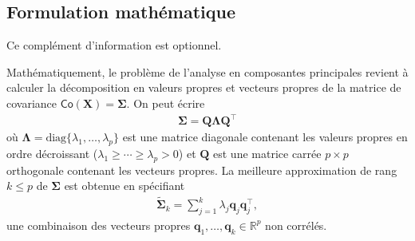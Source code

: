 \documentclass[
  11pt,
  letterpaper,
]{scrbook}
\theoremstyle{definition}
\theoremstyle{remark}
\begin{document}
\hypertarget{formulation-mathuxe9matique}{%
\subsection{Formulation
mathématique}\label{formulation-mathuxe9matique}}

Ce complément d'information est optionnel.

Mathématiquement, le problème de l'analyse en composantes principales
revient à calculer la décomposition en valeurs propres et vecteurs
propres de la matrice de covariance
\(\mathsf{Co}(\boldsymbol{X})=\boldsymbol{\Sigma}\). On peut écrire
\begin{align*}
\boldsymbol{\Sigma} = \boldsymbol{Q}\boldsymbol{\Lambda}\boldsymbol{Q}^\top
\end{align*} où
\(\boldsymbol{\Lambda} = \mathrm{diag}\{\lambda_1, \ldots, \lambda_p\}\)
est une matrice diagonale contenant les valeurs propres en ordre
décroissant (\(\lambda_1 \geq \cdots \geq \lambda_p > 0\)) et
\(\boldsymbol{Q}\) est une matrice carrée \(p \times p\) orthogonale
contenant les vecteurs propres. La meilleure approximation de rang
\(k \leq p\) de \(\boldsymbol{\Sigma}\) est obtenue en spécifiant
\begin{align*}
\widetilde{\boldsymbol{\Sigma}}_k = \sum_{j=1}^k \lambda_j \boldsymbol{q}_j\boldsymbol{q}_j^\top,
\end{align*} une combinaison des vecteurs propres
\(\boldsymbol{q}_1, \ldots, \boldsymbol{q}_k \in \mathbb{R}^p\) non
corrélés.
\end{document}

